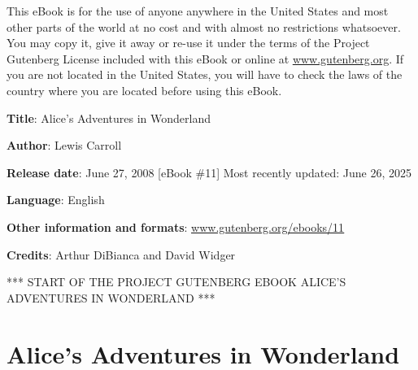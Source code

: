 \documentclass[11pt,openany,oneside]{book}
\begin{document}
\begin{titlepage}
\AddToShipoutPictureBG*{\AtPageCenter{\makebox[0pt]{\raisebox{-0.5\height}{\rule{2pt}{2pt}}}}}
\mbox{}
\end{titlepage}
\tableofcontents\clearpage
{

}
This eBook is for the use of anyone anywhere in the United States and most other parts of the world at no cost and with almost no restrictions whatsoever. You may copy it, give it away or re-use it under the terms of the Project Gutenberg License included with this eBook or online at \href{https://www.gutenberg.org}{\uline{www.gutenberg.org}}. If you are not located in the United States, you will have to check the laws of the country where you are located before using this eBook.

{\bfseries Title}: Alice's Adventures in Wonderland

{\bfseries Author}: Lewis Carroll

\vspace{\baselineskip}
{\bfseries Release date}: June 27, 2008 [eBook \#11]\newline
 Most recently updated: June 26, 2025

{\bfseries Language}: English

{\bfseries Other information and formats}: \href{https://www.gutenberg.org/ebooks/11}{\uline{www.gutenberg.org/ebooks/11}}

{\bfseries Credits}: Arthur DiBianca and David Widger

*** START OF THE PROJECT GUTENBERG EBOOK ALICE'S ADVENTURES IN WONDERLAND *** 

{\centering \vspace{\baselineskip}
}

\clearpage{}
{}
\chapter*{Alice’s Adventures in Wonderland}
\hypertarget{d1.fp1648}{}

{

}

\clearpage{}
{}
\end{document}
